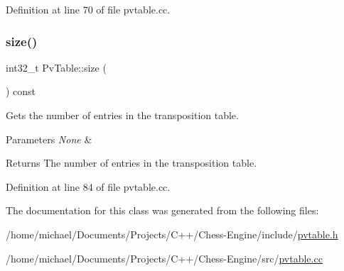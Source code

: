Definition at line 70 of file pvtable.\+cc.

\mbox{\label{classPvTable_a6df38f01a626250eb8d1878d1fbb0029}} 
\subsubsection{\texorpdfstring{size()}{size()}}
{\footnotesize\ttfamily int32\+\_\+t Pv\+Table\+::size (\begin{DoxyParamCaption}{ }\end{DoxyParamCaption}) const\hspace{0.3cm}{\ttfamily [noexcept]}}



Gets the number of entries in the transposition table. 


\begin{DoxyParams}{Parameters}
{\em None} & \\
\hline
\end{DoxyParams}
\begin{DoxyReturn}{Returns}
The number of entries in the transposition table. 
\end{DoxyReturn}


Definition at line 84 of file pvtable.\+cc.



The documentation for this class was generated from the following files\+:\begin{DoxyCompactItemize}
\item 
/home/michael/\+Documents/\+Projects/\+C++/\+Chess-\/\+Engine/include/\mbox{\hyperlink{pvtable_8h}{pvtable.\+h}}\item 
/home/michael/\+Documents/\+Projects/\+C++/\+Chess-\/\+Engine/src/\mbox{\hyperlink{pvtable_8cc}{pvtable.\+cc}}\end{DoxyCompactItemize}
